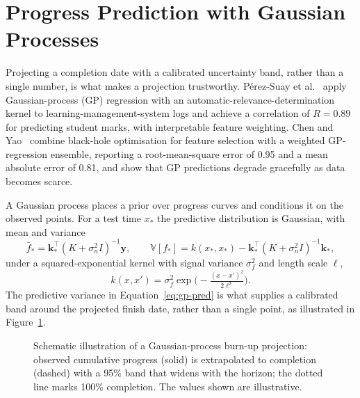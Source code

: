 \section{Progress Prediction with Gaussian Processes}
Projecting a completion date with a calibrated uncertainty band, rather than a single number, is what makes a projection trustworthy. P\'erez-Suay et al.~\cite{perezsuay2024} apply Gaussian-process (GP) regression with an automatic-relevance-determination kernel to learning-management-system logs and achieve a correlation of $R = 0.89$ for predicting student marks, with interpretable feature weighting. Chen and Yao~\cite{chenyao2025} combine black-hole optimisation for feature selection with a weighted GP-regression ensemble, reporting a root-mean-square error of 0.95 and a mean absolute error of 0.81, and show that GP predictions degrade gracefully as data becomes scarce.

A Gaussian process places a prior over progress curves and conditions it on the observed points. For a test time $x_*$ the predictive distribution is Gaussian, with mean and variance
\begin{equation}
\bar{f}_* = \mathbf{k}_*^{\top}(K+\sigma_n^2 I)^{-1}\mathbf{y}, \qquad
\mathbb{V}[f_*] = k(x_*,x_*) - \mathbf{k}_*^{\top}(K+\sigma_n^2 I)^{-1}\mathbf{k}_*,
\label{eq:gp-pred}
\end{equation}
under a squared-exponential kernel with signal variance $\sigma_f^2$ and length scale $\ell$,
\begin{equation}
k(x,x') = \sigma_f^2 \exp\!\Big(-\tfrac{(x-x')^2}{2\ell^2}\Big).
\label{eq:gp-kernel}
\end{equation}
The predictive variance in Equation~\eqref{eq:gp-pred} is what supplies a calibrated band around the projected finish date, rather than a single point, as illustrated in Figure~\ref{fig:gp-burnup}.

\begin{figure}[htbp]
\centering
{}
\caption{Schematic illustration of a Gaussian-process burn-up projection: observed cumulative progress (solid) is extrapolated to completion (dashed) with a 95\% band that widens with the horizon; the dotted line marks 100\% completion. The values shown are illustrative.}
\label{fig:gp-burnup}
\end{figure}

